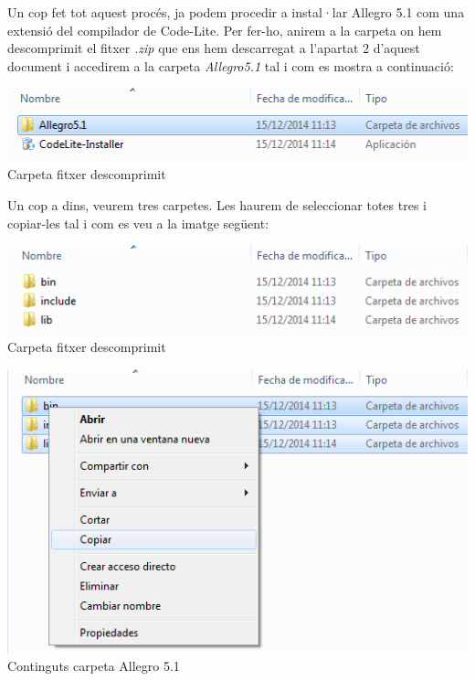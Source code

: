 \documentclass[11pt]{article}
\begin{document}
\noindent Un cop fet tot aquest procés, ja podem procedir a instal·lar Allegro 5.1 com una extensió del compilador de Code-Lite. Per fer-ho, anirem a la carpeta on hem descomprimit el fitxer \textit{.zip} que ens hem descarregat a l'apartat 2 d'aquest document i accedirem a la carpeta \textit{Allegro5.1} tal i com es mostra a continuació:

\begin{center}
\includegraphics[scale=0.6]{img/Allegro5_Source.png}\\
\small{Carpeta fitxer descomprimit}
\end{center}

\noindent Un cop a dins, veurem tres carpetes. Les haurem de seleccionar totes tres i copiar-les tal i com es veu a la imatge següent:

\begin{center}
\includegraphics[scale=0.6]{img/Origin_Folder.png}\\
\small{Carpeta fitxer descomprimit}
\end{center}

\begin{center}
\includegraphics[scale=0.5]{img/Copy.png}\\
\small{Continguts carpeta Allegro 5.1}
\end{center}
\end{document}
